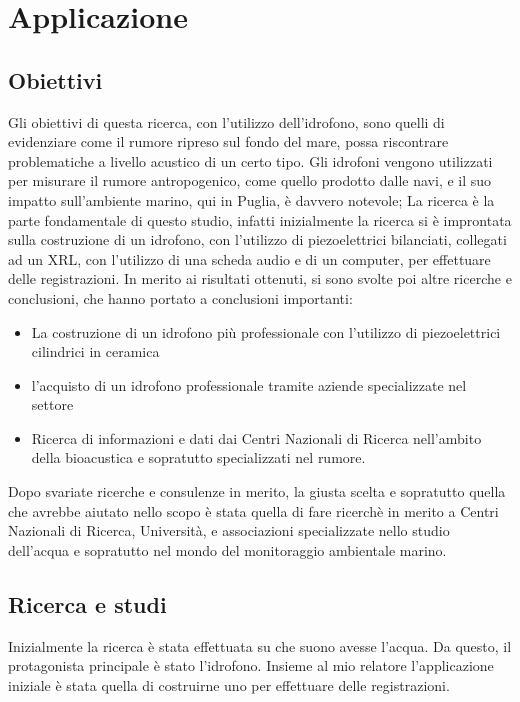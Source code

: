 \chapter{Applicazione}

\section{Obiettivi}
Gli obiettivi di questa ricerca, con l’utilizzo dell’idrofono, sono quelli di evidenziare come il rumore ripreso sul fondo del mare, possa riscontrare problematiche a livello acustico di un certo tipo.
Gli idrofoni vengono utilizzati per misurare il rumore antropogenico, come quello prodotto dalle navi, e il suo impatto sull'ambiente marino, qui in Puglia, è davvero notevole;
La ricerca è la parte fondamentale di questo studio, infatti inizialmente la ricerca si è improntata sulla costruzione di un idrofono, con l'utilizzo di piezoelettrici bilanciati, collegati ad un XRL, con l'utilizzo di una scheda audio e di un computer, per effettuare delle registrazioni. 
In merito ai risultati ottenuti, si sono svolte poi altre ricerche e conclusioni, che hanno portato a conclusioni importanti: 

\begin{itemize}
\item La costruzione di un idrofono più professionale con l'utilizzo di piezoelettrici cilindrici in ceramica
\item l'acquisto di un idrofono professionale tramite aziende specializzate nel settore
\item Ricerca di informazioni e dati dai Centri Nazionali di Ricerca nell'ambito della bioacustica e sopratutto specializzati nel rumore. 
\end{itemize}

Dopo svariate ricerche e consulenze in merito, la giusta scelta e sopratutto quella che avrebbe aiutato nello scopo è stata quella di fare ricerchè in merito a Centri Nazionali di Ricerca, Università, e associazioni specializzate nello studio dell'acqua e sopratutto nel mondo del monitoraggio ambientale marino. 

\section{Ricerca e studi}
Inizialmente la ricerca è stata effettuata su che suono avesse l'acqua. Da questo, il protagonista principale è stato l'idrofono. 
Insieme al mio relatore l'applicazione iniziale è stata quella di costruirne uno per effettuare delle registrazioni.


